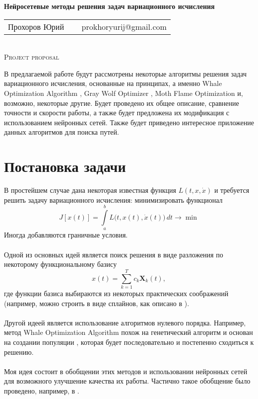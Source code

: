 \documentclass[14pt,a4paper]{article}
\begin{document}
	\begin{center} 
	\huge{\bfseries Нейросетевые методы решения задач вариационного исчисления} \\
	[0.5cm]
	\begin{tabular}{c   c} Прохоров Юрий  { $\ \ \ \ $   } &  prokhoryurij@gmail.com \end{tabular}
	{}\\[1em]
	\textsc{\Large Project proposal}\\[1em]
	\end{center}

\noindent В предлагаемой работе будут рассмотрены некоторые алгоритмы решения задач вариационного исчисления, основанные на  принципах, а именно Whale Optimization Algorithm \cite{whale}, Gray Wolf Optimizer \cite{graywolf}, Moth Flame Optimization \cite{moth} и, возможно, некоторые другие. Будет проведено их общее описание, сравнение точности и скорости работы, а также будет предложена их модификация с использованием нейронных сетей. Также будет приведено интересное приложение данных алгоритмов для поиска путей.

\section{Постановка задачи}
В простейшем случае дана некоторая известная функция $L(t, x, \dot{x})$ и требуется решить задачу вариационного исчисления: минимизировать функционал
\begin{equation}J[x(t)] = \int\limits_a^b L\big(t, x(t), \dot{x}(t)\big) \, dt \longrightarrow \min \end{equation}
Иногда добавляются граничные условия.\\\\
Одной из основных идей является поиск решения в виде разложения по некоторому функциональному базису
\begin{equation}
x(t) = \sum_{k=1}^T c_k \mathbf{X}_k(t),
\end{equation}
где функции базиса выбираются из некоторых практических соображений (например, можно строить в виде сплайнов, как описано в \cite{nnarticle}).\\\\
Другой идеей является использование алгоритмов нулевого порядка. Например, метод Whale Optimization Algorithm \cite{whale} похож на генетический алгоритм и основан на создании популяции , которая будет последовательно  и постепенно сходиться к решению.\\\\
Моя идея состоит в обобщении этих методов и использовании нейронных сетей для возможного улучшение качества их работы. Частично такое обобщение было проведено, например, в \cite{dissertation}.
\end{document}
